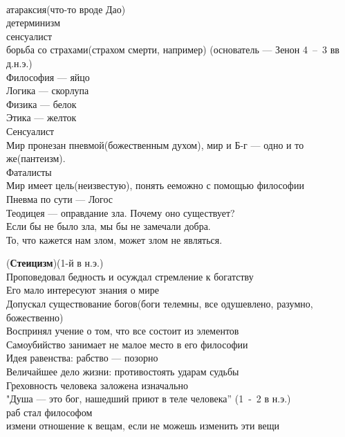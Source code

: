 \documentclass[a4paper,12pt]{report} %
\begin{document}
\begin{itemize}
  \begin{enumerate}
    \\атараксия(что-то вроде Дао)
    \\детерминизм
    \\сенсуалист
    \\борьба со страхами(страхом смерти, например)
  (основатель --- Зенон 4~--~3 вв д.н.э.)
    \\Философия --- яйцо
    \\Логика --- скорлупа
    \\Физика --- белок
    \\Этика --- желток
    \\Сенсуалист
    \\Мир пронезан пневмой(божественным духом), мир и Б-г --- одно и то
    же(пантеизм).
    \\Фаталисты
    \\Мир имеет цель(неизвестую), понять ееможно с помощью философии
    \\Пневма по сути --- Логос
    \\Теодицея --- оправдание зла. Почему оно существует?
    \\Если бы не было зла, мы бы не замечали добра.
    \\То, что кажется нам злом, может злом не являться.
  \end{enumerate}
  \begin{enumerate}
  (\textbf{Стеицизм})(1-й в н.э.)
    \\Проповедовал бедность и осуждал стремление к богатству
    \\Его мало интересуют знания о мире
    \\Допускал существование богов(боги телемны, все одушевлено, разумно,
    божественно)
    \\Воспринял учение о том, что все состоит из элементов
    \\Самоубийство занимает не малое место в его философии
    \\Идея равенства: рабство --- позорно
    \\Величайшее дело жизни: противостоять ударам судьбы
    \\Греховность человека заложена изначально
    \\"Душа --- это бог, нашедший приют в теле человека''
  (1~-~2 в н.э.)
    \\раб стал философом
    \\измени отношение к вещам, если не можешь изменить эти вещи

\end{enumerate}
\end{itemize}
\end{document}
